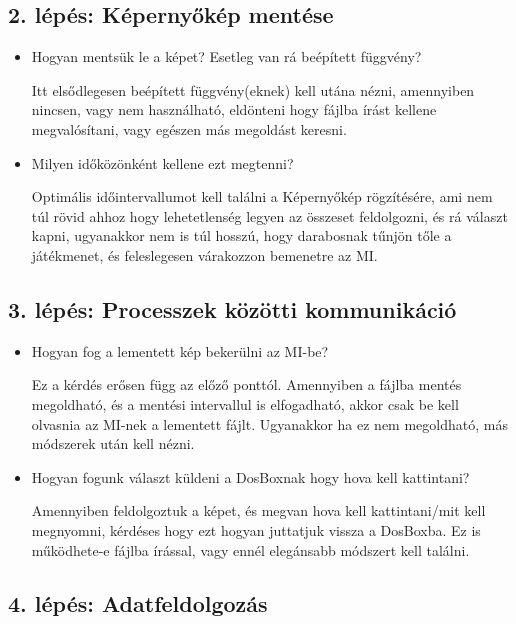 \subsection{2. lépés: Képernyőkép mentése}

\begin{itemize}
    \item Hogyan mentsük le a képet? Esetleg van rá beépített függvény?
    
    Itt elsődlegesen beépített függvény(eknek) kell utána nézni, amennyiben nincsen, vagy nem használható, eldönteni hogy fájlba írást kellene megvalósítani, vagy egészen más megoldást keresni.
    \item Milyen időközönként kellene ezt megtenni?
    
    Optimális időintervallumot kell találni a Képernyőkép rögzítésére, ami nem túl rövid ahhoz hogy lehetetlenség legyen az összeset feldolgozni, és rá választ kapni, ugyanakkor nem is túl hosszú, hogy darabosnak tűnjön tőle a játékmenet, és feleslegesen várakozzon bemenetre az MI.
\end{itemize}

\subsection{3. lépés: Processzek közötti kommunikáció}

\begin{itemize}
    \item Hogyan fog a lementett kép bekerülni az MI-be?
    
    Ez a kérdés erősen függ az előző ponttól. Amennyiben a fájlba mentés megoldható, és a mentési intervallul is elfogadható, akkor csak be kell olvasnia az MI-nek a lementett fájlt. Ugyanakkor ha ez nem megoldható, más módszerek után kell nézni.  
    
    \item Hogyan fogunk választ küldeni a DosBoxnak hogy hova kell kattintani?
    
    Amennyiben feldolgoztuk a képet, és megvan hova kell kattintani/mit kell megnyomni, kérdéses hogy ezt hogyan juttatjuk vissza a DosBoxba. Ez is működhete-e fájlba írással, vagy ennél elegánsabb módszert kell találni.  

\end{itemize}


\subsection{4. lépés: Adatfeldolgozás}

